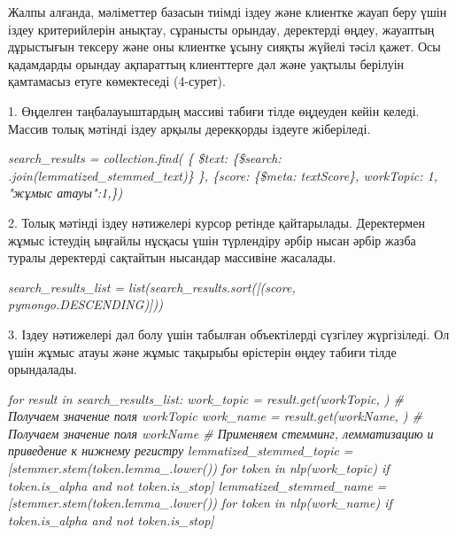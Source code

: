 \begin{multicols}{2}
Жалпы алғанда, мәліметтер базасын тиімді іздеу және клиентке жауап беру
үшін іздеу критерийлерін анықтау, сұранысты орындау, деректерді өңдеу,
жауаптың дұрыстығын тексеру және оны клиентке ұсыну сияқты жүйелі тәсіл
қажет. Осы қадамдарды орындау ақпараттың клиенттерге дәл және уақтылы
берілуін қамтамасыз етуге көмектеседі (4-сурет).

1. Өңделген таңбалауыштардың массиві табиғи тілде өңдеуден кейін келеді.
Массив толық мәтінді іздеу арқылы дерекқорды іздеуге жіберіледі.

\emph{search\_results = collection.find( \{
\textquotesingle\$text\textquotesingle:
\{\textquotesingle\$search\textquotesingle: \textquotesingle{}
\textquotesingle.join(lemmatized\_stemmed\_text)\} \},
\{\textquotesingle score\textquotesingle:
\{\textquotesingle\$meta\textquotesingle:
\textquotesingle textScore\textquotesingle\},
\textquotesingle workTopic\textquotesingle: 1, "жұмыс атауы":1,\})}

2. Толық мәтінді іздеу нәтижелері курсор ретінде қайтарылады.
Деректермен жұмыс істеудің ыңғайлы нұсқасы үшін түрлендіру әрбір нысан
әрбір жазба туралы деректерді сақтайтын нысандар массивіне жасалады.

\emph{search\_results\_list =
list(search\_results.sort({[}(\textquotesingle score\textquotesingle,
pymongo.DESCENDING){]}))}

3. Іздеу нәтижелері дәл болу үшін табылған объектілерді сүзгілеу
жүргізіледі. Ол үшін жұмыс атауы және жұмыс тақырыбы өрістерін өңдеу
табиғи тілде орындалады.

\emph{for result in search\_results\_list: work\_topic =
result.get(\textquotesingle workTopic\textquotesingle,
\textquotesingle\textquotesingle) \# Получаем значение поля workTopic
work\_name = result.get(\textquotesingle workName\textquotesingle,
\textquotesingle\textquotesingle) \# Получаем значение поля workName \#
Применяем стемминг, лемматизацию и приведение к нижнему регистру
lemmatized\_stemmed\_topic = {[}stemmer.stem(token.lemma\_.lower()) for
token in nlp(work\_topic) if token.is\_alpha and not token.is\_stop{]}
lemmatized\_stemmed\_name = {[}stemmer.stem(token.lemma\_.lower()) for
token in nlp(work\_name) if token.is\_alpha and not token.is\_stop{]}}


\end{multicols}
 

